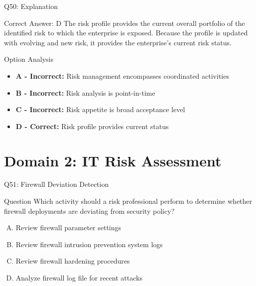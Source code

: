 \documentclass{beamer}
\begin{document}
	\begin{frame}{Q50: Explanation}
		\begin{block}{Correct Answer: D}
			The risk profile provides the current overall portfolio of the identified risk to which the enterprise is exposed. Because the profile is updated with evolving and new risk, it provides the enterprise's current risk status.
		\end{block}
		\begin{block}{Option Analysis}
			\begin{itemize}
				\item \textbf{A - Incorrect:} Risk management encompasses coordinated activities
				\item \textbf{B - Incorrect:} Risk analysis is point-in-time
				\item \textbf{C - Incorrect:} Risk appetite is broad acceptance level
				\item \textbf{D - Correct:} Risk profile provides current status
			\end{itemize}
		\end{block}
	\end{frame}
	
	
	\section{Domain 2: IT Risk Assessment}
	
	\begin{frame}{Q51: Firewall Deviation Detection}
		\begin{block}{Question}
			Which activity should a risk professional perform to determine whether firewall deployments are deviating from security policy?
		\end{block}
		\begin{enumerate}[(A)]
			\item Review firewall parameter settings
			\item Review firewall intrusion prevention system logs
			\item Review firewall hardening procedures
			\item Analyze firewall log file for recent attacks
		\end{enumerate}
	\end{frame}
	
\end{document}
